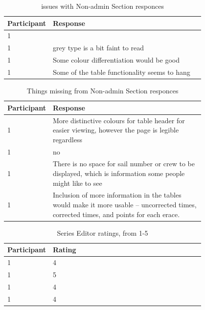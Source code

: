 \documentclass{l4proj}
\begin{document}
\begin{appendices}
\begin{table}[!ht]
    \centering
    \caption{issues with Non-admin Section responces}
    \begin{tabular}{|l|p{0.8\linewidth}|}
    \hline
        \textbf{Participant} & \textbf{Response}  \\ \hline
        1 &   \\ \hline
        1 & grey type is a bit faint to read  \\ \hline
        1 & Some colour differentiation would be good  \\ \hline
        1 & Some of the table functionality seems to hang  \\ \hline
    \end{tabular}
\end{table}
\begin{table}[!ht]
    \centering
    \caption{Things missing from Non-admin Section responces}
    \begin{tabular}{|l|p{0.8\linewidth}|}
    \hline
        \textbf{Participant} & \textbf{Response}  \\ \hline
        1 & More distinctive colours for table header for easier viewing, however the page is legible regardless  \\ \hline
        1 & no  \\ \hline
        1 & There is no space for sail number or crew to be displayed, which is information some people might like to see  \\ \hline
        1 & Inclusion of more information in the tables would make it more usable -- uncorrected times, corrected times, and points for each erace.  \\ \hline
    \end{tabular}
\end{table}
\begin{table}[!ht]
    \centering
    \caption{Series Editor ratings, from 1-5}
    \begin{tabular}{|l|p{0.8\linewidth}|}
    \hline
        \textbf{Participant} & \textbf{Rating}  \\ \hline
        1 & 4  \\ \hline
        1 & 5  \\ \hline
        1 & 4  \\ \hline
        1 & 4  \\ \hline
    \end{tabular}
\end{table}
\begin{table}[!ht]
    \centering

\end{table}
\end{appendices}
\end{document}
